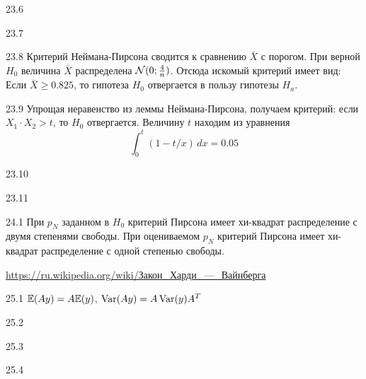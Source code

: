 \begin{solution}{{23.6}}
\end{solution}
\protect \hypertarget {soln:23.7}{}
\begin{solution}{{23.7}}

\end{solution}
\protect \hypertarget {soln:23.8}{}
\begin{solution}{{23.8}}
Критерий Неймана-Пирсона сводится к сравнению $\bar X$ с порогом. При верной $H_0$ величина $\bar X$ распределена $\mathcal{N}(0; \frac{4}{n})$.
Отсюда искомый критерий имеет вид:
Если $\bar X  \geqslant 0.825$, то гипотеза ${H_0}$ отвергается в пользу гипотезы ${H_a}$.
\end{solution}
\protect \hypertarget {soln:23.9}{}
\begin{solution}{{23.9}}
  Упрощая неравенство из леммы Неймана-Пирсона, получаем критерий: если $X_1\cdot X_2 >t$, то $H_0$ отвергается. Величину $t$ находим из уравнения
\[
\int_0^t (1 - t/x) \, dx = 0.05
\]
\end{solution}
\protect \hypertarget {soln:23.10}{}
\begin{solution}{{23.10}}

\end{solution}
\protect \hypertarget {soln:23.11}{}
\begin{solution}{{23.11}}
\end{solution}
\protect \hypertarget {soln:24.1}{}
\begin{solution}{{24.1}}
При $p_N$ заданном в $H_0$ критерий Пирсона имеет хи-квадрат распределение с двумя степенями свободы.
При оцениваемом $p_N$ критерий Пирсона имеет хи-квадрат распределение с одной степенью свободы.

\url{https://ru.wikipedia.org/wiki/Закон_Харди_—_Вайнберга}
  
\end{solution}
\protect \hypertarget {soln:25.1}{}
\begin{solution}{{25.1}}
$\mathbb{E}(Ay)=A\mathbb{E}(y)$, $\operatorname{Var}(Ay)=A\operatorname{Var}(y)A^T$
\end{solution}
\protect \hypertarget {soln:25.2}{}
\begin{solution}{{25.2}}

\end{solution}
\protect \hypertarget {soln:25.3}{}
\begin{solution}{{25.3}}

\end{solution}
\protect \hypertarget {soln:25.4}{}
\begin{solution}{{25.4}}

\end{solution}
